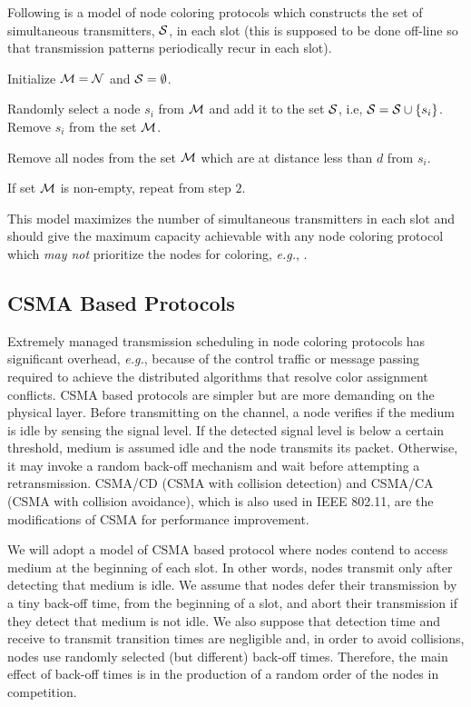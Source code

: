 \documentclass[12pt,english]{article}
\begin{document}
Following is a model of node coloring protocols which constructs the set of simultaneous transmitters, ${\cal S}$, in each slot (this is supposed to be done off-line so that transmission patterns periodically recur in each slot).
\begin{compactenum}
\item Initialize ${\cal M}={\cal N}$ and ${\cal S}=\emptyset$.
\item Randomly select a node $s_{i}$ from ${\cal M}$ and add it to the set ${\cal S}$, i.e, ${\cal S}={\cal S}\cup\{s_{i}\}$. Remove $s_{i}$ from the set ${\cal M}$.
\item Remove all nodes from the set ${\cal M}$ which are at distance less than $d$ from $s_{i}$.
\item If set ${\cal M}$ is non-empty, repeat from step $2$.
\end{compactenum}
This model maximizes the number of simultaneous transmitters in each slot and should give the maximum capacity achievable with any node coloring protocol which {\em may not} prioritize the nodes for coloring, {\it e.g.}, \cite{DRAND}.

\subsection{CSMA Based Protocols}
\label{sec:csma}

Extremely managed transmission scheduling in node coloring protocols has significant overhead, {\it e.g.}, because of the control traffic or message passing required to achieve the distributed algorithms that resolve color assignment conflicts. CSMA based protocols are simpler but are more demanding on the physical layer. Before transmitting on the channel, a node verifies if the medium is idle by sensing the signal level. If the detected signal level is below a certain threshold, medium is assumed idle and the node transmits its packet. Otherwise, it may invoke a random back-off mechanism and wait before attempting a retransmission. CSMA/CD (CSMA with collision detection) and CSMA/CA (CSMA with collision avoidance), which is also used in IEEE 802.11, are the modifications of CSMA for performance improvement. 

We will adopt a model of CSMA based protocol where nodes contend to access medium at the beginning of each slot. In other words, nodes transmit only after detecting that medium is idle. We assume that nodes defer their transmission by a tiny back-off time, from the beginning of a slot, and abort their transmission if they detect that medium is not idle. We also suppose that detection time and receive to transmit transition times are negligible and, in order to avoid collisions, nodes use randomly selected (but different) back-off times. Therefore, the main effect of back-off times is in the production of a random order of the nodes in competition.  
\end{document}
